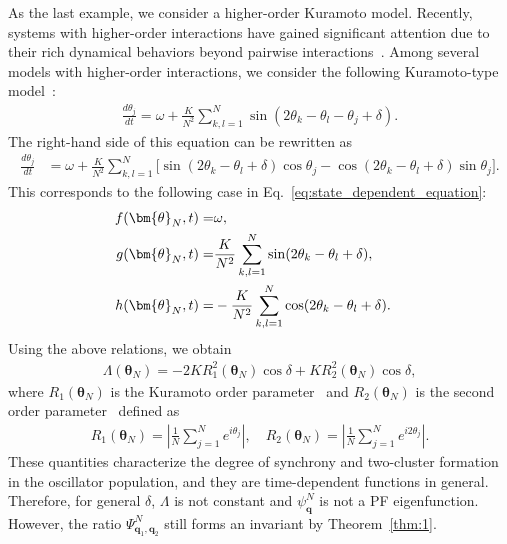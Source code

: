 \documentclass[
amsmath,amssymb,
]{revtex4-2}
\begin{document}
As the last example, we consider a higher-order Kuramoto model.
%
Recently, systems with higher-order interactions have gained significant attention due to their rich dynamical behaviors beyond pairwise interactions~\cite{tanaka2011multistable,skardal2020higher,leon2024anomalous,leon2025theory,jain2025higher,fujii2025emergence}. 
Among several models with higher-order interactions, we consider the following Kuramoto-type model~\cite{skardal2020higher,leon2024anomalous,leon2025theory}:
\begin{align}
\label{eq:higher_order}
    \frac{d\theta_j}{dt} = \omega + \frac{K}{N^2} \sum_{k,l=1}^{N} \sin(2\theta_k - \theta_l - \theta_j + \delta).
\end{align}
% 
The right-hand side of this equation can be rewritten as
\begin{align}
\frac{d\theta_j}{dt} 
    &= \omega + \frac{K}{N^2} \sum_{k,l=1}^{N} \big[
        \sin(2\theta_k - \theta_l + \delta) \cos \theta_j
        - \cos(2\theta_k - \theta_l + \delta) \sin \theta_j
    \big].
\end{align}
%
This corresponds to the following case in Eq.~\eqref{eq:state_dependent_equation}:
%
\begin{align}
    f(\bm{\theta}_N, t) =& \omega, \cr
    g(\bm{\theta}_N, t) =& \frac{K}{N^2} \sum_{k,l=1}^N \sin(2\theta_k - \theta_l + \delta), \cr
    h(\bm{\theta}_N, t) =& -\frac{K}{N^2} \sum_{k,l=1}^N \cos(2\theta_k - \theta_l + \delta).
\end{align}
Using the above relations, we obtain
\begin{align}
    \Lambda(\bm{\theta}_N) = - 2K R_1^2(\bm{\theta}_N) \cos \delta + K R_2^2(\bm{\theta}_N) \cos \delta,
\end{align}
where $R_1(\bm{\theta}_N)$ is the Kuramoto order parameter~\cite{Kuramoto1984chemical} and $R_2(\bm{\theta}_N)$ is the second order parameter~\cite{daido1992order} defined as
%
\begin{align}
    R_1(\bm{\theta}_N) = \left|\frac{1}{N}\sum_{j=1}^{N}e^{i\theta_j}\right|,\quad R_2(\bm{\theta}_N) = \left|\frac{1}{N}\sum_{j=1}^{N}e^{i2\theta_j}\right|.
\end{align}
%
These quantities characterize the degree of synchrony and two-cluster formation in the oscillator population, and they are time-dependent functions in general. 
Therefore, for general $\delta$, $\Lambda$ is not constant and $\psi^N_{\bm{q}}$ is not a PF eigenfunction.
However, the ratio $\Psi^N_{\bm{q}_1,\bm{q}_2}$ still forms an invariant by Theorem~\ref{thm:1}.
\end{document}
